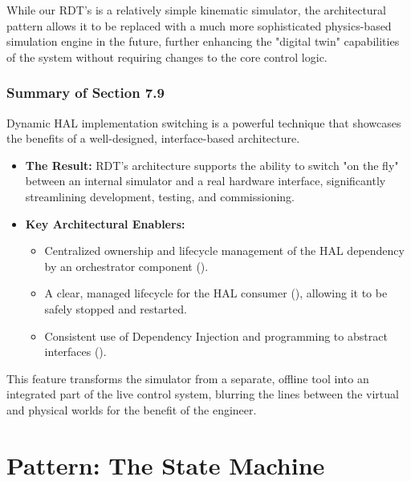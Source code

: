 While our RDT's  is a relatively simple kinematic simulator, the architectural pattern allows it to be replaced with a much more sophisticated physics-based simulation engine in the future, further enhancing the "digital twin" capabilities of the system without requiring changes to the core control logic.

\subsubsection{Summary of Section 7.9}
\label{subsubsec:section7_9_summary_conceptual}
Dynamic HAL implementation switching is a powerful technique that showcases the benefits of a well-designed, interface-based architecture.
\begin{itemize}
    \item \textbf{The Result:} RDT's architecture supports the ability to switch "on the fly" between an internal simulator and a real hardware interface, significantly streamlining development, testing, and commissioning.
    \item \textbf{Key Architectural Enablers:}
    \begin{itemize}
        \item Centralized ownership and lifecycle management of the HAL dependency by an orchestrator component ().
        \item A clear, managed lifecycle for the HAL consumer (), allowing it to be safely stopped and restarted.
        \item Consistent use of Dependency Injection and programming to abstract interfaces ().
    \end{itemize}
\end{itemize}
This feature transforms the simulator from a separate, offline tool into an integrated part of the live control system, blurring the lines between the virtual and physical worlds for the benefit of the engineer.









\section{Pattern: The State Machine}
\label{sec:pattern_state_machine_conceptual_revised}

